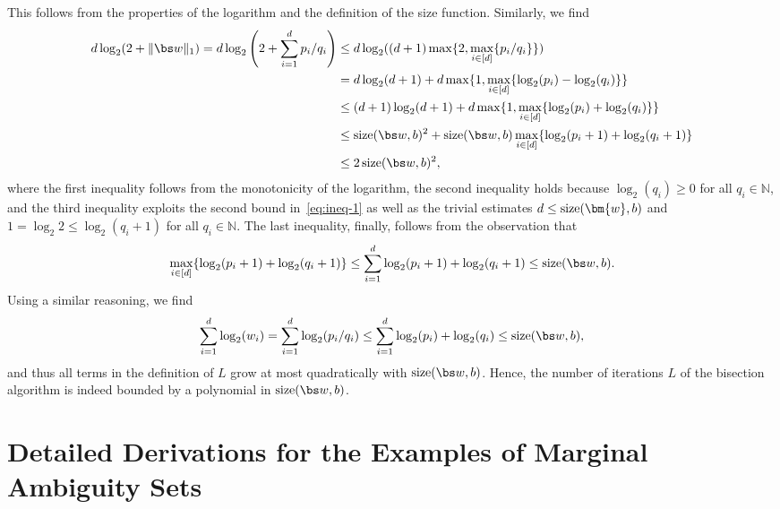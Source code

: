 \documentclass[11pt, a4paper, oneside, reqno]{article}
\begin{document}
	This follows from the properties of the logarithm and the definition of the size function. Similarly, we find 
	\begin{align*}
	d \log_2(2 + \|\bs w\|_1) = d\log_2\left (2 + \sum\limits_{i=1}^d {p_i}/{q_i}\right) &\leq d\log_2((d+1) \max\{2, \max_{i \in [d]}\{p_i/q_i\}\})\\
	&=d\log_2(d+1)+ d\max\{1, \max_{i \in [d]}\{\log_2(p_i) - \log_2(q_i)\}\}\\
	&\leq (d+1)\log_2(d+1)+ d\max\{1,\max_{i \in [d]}\{ \log_2(p_i) + \log_2(q_i)\}\}\\
	&\leq \text{size}(\bs w, b)^2 + \text{size}(\bs w, b)\max_{i \in [d]}\{\log_2(p_i + 1) + \log_2(q_i+1)\}\\
	&\leq 2\,\text{size}(\bs w, b)^2,
	\end{align*}
	where the first inequality follows from the monotonicity of the logarithm, the second inequality holds because  $\log_2(q_i) \geq 0$ for all $q_i \in \mathbb N$, and the third inequality exploits the second bound in~\eqref{eq:ineq-1} as well as the trivial estimates $d\leq {\rm{size}}(\bm {w}, b)$ and $1=\log_2 2\leq \log_2(q_i+1)$ for all $q_i \in \mathbb N$. The last inequality, finally, follows from the observation that
	\begin{equation*}
	\max_{i \in [d]}\{\log_2(p_i + 1) + \log_2(q_i+1)\}
	\leq  \sum\limits_{i=1}^d \log_2(p_i + 1)+ \log_2(q_i + 1) \leq \text{size}(\bs w, b). 
	\end{equation*}
	Using a similar reasoning, we find 
	\begin{align*}
	\sum\limits_{i=1}^d \log_2(w_i) = \sum\limits_{i=1}^d \log_2(p_i / q_i ) \leq \sum\limits_{i=1}^d \log_2(p_i)+ \log_2(q_i) \leq \text{size}(\bs w, b),
	\end{align*}
	and thus all terms in the definition of $L$ grow at most quadratically with $\text{size}(\bs w, b)$. Hence, the number of iterations $L$ of the bisection algorithm is indeed bounded by a polynomial in $\text{size}(\bs w, b)$.
    
    \section{Detailed Derivations for the Examples of Marginal Ambiguity Sets}
    \label{appendix:derivations}
    
\end{document}
